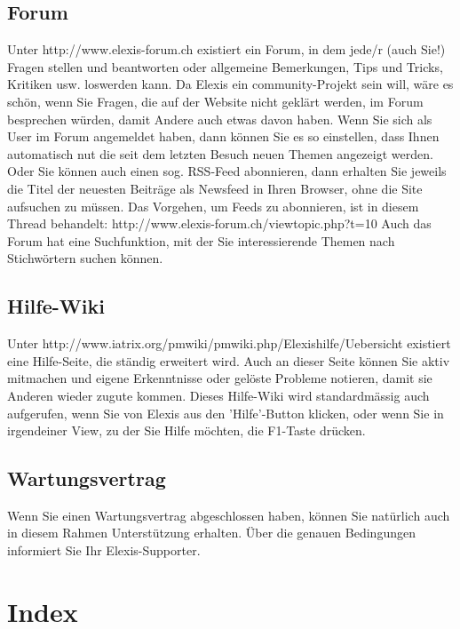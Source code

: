 \documentclass[a4paper]{scrartcl}
\begin{document}
\subsection{Forum}
Unter http://www.elexis-forum.ch existiert ein Forum, in dem jede/r (auch Sie!) Fragen stellen und beantworten oder allgemeine Bemerkungen, Tips und Tricks, Kritiken usw. loswerden kann. Da Elexis ein community-Projekt sein will, wäre es schön, wenn Sie Fragen, die auf der Website nicht geklärt werden, im Forum besprechen würden, damit Andere auch etwas davon haben.
Wenn Sie sich als User im Forum angemeldet haben, dann können Sie es so einstellen, dass Ihnen automatisch nut die seit dem letzten Besuch neuen Themen angezeigt werden. Oder Sie können auch einen sog. RSS-Feed abonnieren, dann erhalten Sie jeweils die Titel der neuesten Beiträge als Newsfeed in Ihren Browser, ohne die Site aufsuchen zu müssen. Das Vorgehen, um Feeds zu abonnieren, ist in diesem Thread behandelt: http://www.elexis-forum.ch/viewtopic.php?t=10
Auch das Forum hat eine Suchfunktion, mit der Sie interessierende Themen nach Stichwörtern suchen können.

\subsection{Hilfe-Wiki}
Unter http://www.iatrix.org/pmwiki/pmwiki.php/Elexishilfe/Uebersicht existiert eine Hilfe-Seite, die ständig erweitert wird. Auch an dieser Seite können Sie aktiv mitmachen und eigene Erkenntnisse oder gelöste Probleme notieren, damit sie Anderen wieder zugute kommen.
Dieses Hilfe-Wiki wird standardmässig auch aufgerufen, wenn Sie von Elexis aus den 'Hilfe'-Button klicken, oder wenn Sie in irgendeiner View, zu der Sie Hilfe möchten, die F1-Taste drücken.

\subsection{Wartungsvertrag}
Wenn Sie einen Wartungsvertrag abgeschlossen haben, können Sie natürlich auch in diesem Rahmen Unterstützung erhalten. Über die genauen Bedingungen informiert Sie Ihr Elexis-Supporter.

\clearpage
\section{Index}
\printindex
\end{document}
